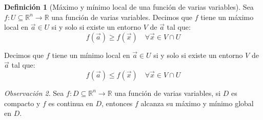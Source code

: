 \documentclass{article}
\newcommand{\R}{\mathbb{R}}
\newcommand{\vect}[1]{\vec{#1}}
\theoremstyle{definition}
\newtheorem{definition}{Definición}[section]
\theoremstyle{plain}
\theoremstyle{remark}
\newtheorem{remark}[definition]{Observación}
\theoremstyle{corollary}
\begin{document}
\begin{definition}[Máximo y mínimo local de una función de varias variables]
Sea $f : U \subseteq \R^n \to \R$ una función de varias variables. Decimos que $f$ tiene un máximo local en $\vect{a} \in U$ si y solo si existe un entorno $V$ de $\vect{a}$ tal que:
\[
f(\vect{a}) \geq f(\vect{x}) \quad \forall \vect{x} \in V \cap U
\]

Decimos que $f$ tiene un mínimo local en $\vect{a} \in U$ si y solo si existe un entorno $V$ de $\vect{a}$ tal que:
\[
f(\vect{a}) \leq f(\vect{x}) \quad \forall \vect{x} \in V \cap U
\]

\end{definition}

\begin{remark}
Sea $f : D \subseteq \R^n \to \R$ una función de varias variables, si $D$ es compacto y $f$ es continua en $D$, entonces $f$ alcanza su máximo y mínimo global en $D$.
\end{remark}
\end{document}
